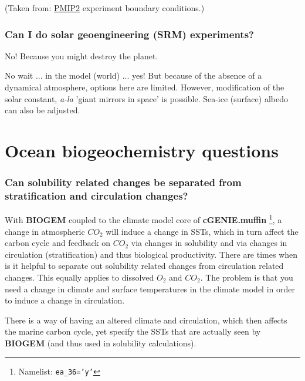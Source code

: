 \documentclass[11pt,fleqn]{book} %
\begin{document}
\noindent (Taken from: \href{https://pmip2.lsce.ipsl.fr/design/boundary.shtml}{PMIP2} experiment boundary conditions.)

%
\subsubsection{Can I do solar geoengineering (SRM) experiments?}

No! Because you might destroy the planet.

\noindent No wait ... in the model (world) ... yes! But because of the absence of a dynamical atmosphere, options here are limited. However, modification of the solar constant, \textit{a-la} 'giant mirrors in space' is possible. Sea-ice (surface) albedo can also be adjusted.


\newpage


\section{Ocean biogeochemistry questions}

%
\subsubsection{Can  solubility related changes be separated from stratification and circulation changes?}

With \textbf{BIOGEM} coupled to the climate model core of \textbf{cGENIE.muffin} \footnote{Namelist: \texttt{ea\_36='y'}}, a change in atmospheric \(CO_{2}\) will induce a change in SSTs, which in turn affect the carbon cycle and feedback on \(CO_{2}\) via changes in solubility and via changes in circulation (stratification) and thus biological productivity. There are times when is it helpful to separate out solubility related changes from circulation related changes. This equally applies to dissolved \(O_{2}\) and \(CO_{2}\). The problem is that you need a change in climate and surface temperatures in the climate model in order to induce a change in circulation.

There is a way of having an altered climate and circulation, which then affects the marine carbon cycle, yet specify the SSTs that are actually seen by \textbf{BIOGEM} (and thus used in solubility calculations).
\end{document}
